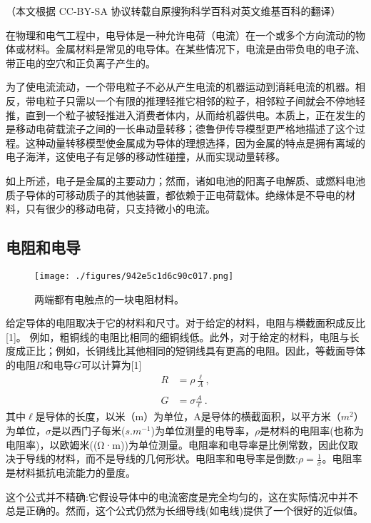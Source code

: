 
（本文根据 CC-BY-SA 协议转载自原搜狗科学百科对英文维基百科的翻译）

在物理和电气工程中，电导体是一种允许电荷（电流）在一个或多个方向流动的物体或材料。金属材料是常见的电导体。在某些情况下，电流是由带负电的电子流、带正电的空穴和正负离子产生的。

为了使电流流动，一个带电粒子不必从产生电流的机器运动到消耗电流的机器。相反，带电粒子只需以一个有限的推理轻推它相邻的粒子，相邻粒子间就会不停地轻推，直到一个粒子被轻推进入消费者体内，从而给机器供电。本质上，正在发生的是移动电荷载流子之间的一长串动量转移；德鲁伊传导模型更严格地描述了这个过程。这种动量转移模型使金属成为导体的理想选择，因为金属的特点是拥有离域的电子海洋，这使电子有足够的移动性碰撞，从而实现动量转移。

如上所述，电子是金属的主要动力；然而，诸如电池的阳离子电解质、或燃料电池质子导体的可移动质子的其他装置，都依赖于正电荷载体。绝缘体是不导电的材料，只有很少的移动电荷，只支持微小的电流。

\subsection{ 电阻和电导}
\begin{figure}[ht]
\centering
\texttt{[image: ./figures/942e5c1d6c90c017.png]}
\caption{两端都有电触点的一块电阻材料。} \label{fig_DDT_1}
\end{figure}
给定导体的电阻取决于它的材料和尺寸。对于给定的材料，电阻与横截面积成反比[1]。 例如，粗铜线的电阻比相同的细铜线低。此外，对于给定的材料，电阻与长度成正比；例如，长铜线比其他相同的短铜线具有更高的电阻。因此，等截面导体的电阻$R$和电导$G$可以计算为[1]
\begin{equation}
\begin{aligned}
R &= \rho \frac{\ell}{A}, \\\\
G &= \sigma \frac{A}{\ell}~.
\end{aligned}
\end{equation}
其中$\ell$是导体的长度，以米（m）为单位，A是导体的横截面积，以平方米（$m^2$）为单位，$\sigma$是以西门子每米($s.m^{-1}$)为单位测量的电导率，$\rho$是材料的电阻率(也称为电阻率)，以欧姆米((Ω·m))为单位测量。电阻率和电导率是比例常数，因此仅取决于导线的材料，而不是导线的几何形状。电阻率和电导率是倒数:$\rho = \frac{1}{\sigma}$。电阻率是材料抵抗电流能力的量度。

这个公式并不精确:它假设导体中的电流密度是完全均匀的，这在实际情况中并不总是正确的。然而，这个公式仍然为长细导线(如电线)提供了一个很好的近似值。

